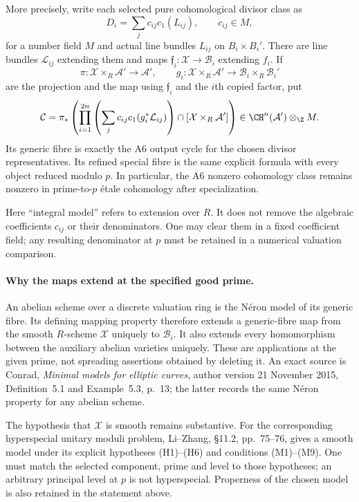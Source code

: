 \documentclass[11pt]{article}
\theoremstyle{definition}\newtheorem{definition}[theorem]{Definition}\newtheorem{remark}[theorem]{Remark}
\begin{document}
More precisely, write each selected pure cohomological divisor class as
\[
 D_i=\sum_j c_{ij}c_1(L_{ij}),\qquad c_{ij}\in M,
\]
for a number field $M$ and actual line bundles $L_{ij}$ on
$B_i\times B_i'$.
There are line bundles $\mathcal L_{ij}$ extending them and
maps $\mathfrak f_i:\mathcal X\to\mathcal B_i$ extending
$f_i$.  If
\[
 \pi:\mathcal X\times_R\mathcal A'\longrightarrow\mathcal A',
 \qquad
 g_i:\mathcal X\times_R\mathcal A'\longrightarrow
                   \mathcal B_i\times_R\mathcal B_i'
\]
are the projection and the map using $\mathfrak f_i$ and
the $i$th copied factor, put
\begin{equation}\label{C23-integral-cycle}
 \mathcal C=
  \pi_*\left(
    \prod_{i=1}^{2n}
        \left(\sum_jc_{ij}c_1(g_i^*\mathcal L_{ij})\right)
        \cap[\mathcal X\times_R\mathcal A']\right)
       \in\CH^n(\mathcal A')\otimes_\Z M.
\end{equation}
Its generic fibre is exactly the A6 output cycle for the chosen
divisor representatives.  Its refined special fibre is the same
explicit formula with every object reduced modulo $p$.
In particular, the A6 nonzero cohomology class remains nonzero
in prime-to-$p$ \'etale cohomology after specialization.

Here ``integral model'' refers to extension over $R$.
It does not remove the algebraic coefficients $c_{ij}$ or their
denominators.  One may clear them in a fixed coefficient field;
any resulting denominator at $p$ must be retained in a numerical
valuation comparison.

\paragraph{Why the maps extend at the specified good prime.}
An abelian scheme over a discrete valuation ring is the N\'eron
model of its generic fibre.  Its defining mapping property
therefore extends a generic-fibre map from the smooth
$R$-scheme $\mathcal X$ uniquely to $\mathcal B_i$.
It also extends every homomorphism between the auxiliary
abelian varieties uniquely.  These are applications at the
given prime, not spreading assertions obtained by deleting it.
An exact source is Conrad, \emph{Minimal models for elliptic
curves}, author version 21 November 2015, Definition~5.1 and
Example~5.3, p.~13; the latter records the same N\'eron property
for any abelian scheme.

The hypothesis that $\mathcal X$ is smooth remains substantive.
For the corresponding hyperspecial unitary moduli problem,
Li--Zhang, \S11.2, pp.~75--76, gives a smooth model under its
explicit hypotheses (H1)--(H6) and conditions (M1)--(M9).
One must match the selected component, prime and level to those
hypotheses; an arbitrary principal level at $p$ is not
hyperspecial.  Properness of the chosen model is also retained
in the statement above.
\end{document}
